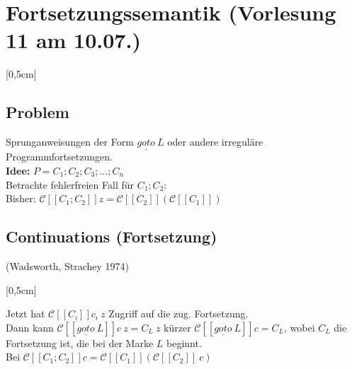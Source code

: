 \section{Fortsetzungssemantik \tiny (Vorlesung 11 am 10.07.)}
[0,5cm]
\subsection{Problem}
Sprunganweisungen der Form $\underline{goto}\ L$ oder andere irreguläre Programmfortsetzungen.\\
\textbf{Idee:} $P = C_1;C_2;C_3;\dots;C_n$\\
Betrachte fehlerfreien Fall für $C_1;C_2$:\\
Bisher: $\mathcal{C}[\![ C_1;C_2 ]\!] z = \mathcal{C}[\![ C_2 ]\!](\mathcal{C}[\![ C_1 ]\!]) $\\

\subsection{Continuations (Fortsetzung)}
(Wadsworth, Strachey 1974)
[0,5cm]

Jetzt hat $\mathcal{C}[\![ C_i ]\!]c_i\ z$ Zugriff auf die zug. Fortsetzung.\\
Dann kann $\mathcal{C}[\![ \underline{goto}\ L ]\!]c\ z = C_L \ z$ kürzer $\mathcal{C}[\![ \underline{goto}\ L ]\!]c = C_L$, wobei $C_L$ die Fortsetzung ist, die bei der Marke $L$ beginnt.\\
Bei $\mathcal{C}[\![ C_1;C_2 ]\!] c = \mathcal{C}[\![ C_1 ]\!](\mathcal{C}[\![ C_2 ]\!] \ c) $\\

